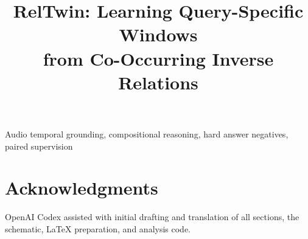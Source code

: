 \documentclass[10pt,letterpaper]{article}
\title{\fontsize{14}{16}\selectfont RelTwin: Learning Query-Specific Windows\\from Co-Occurring Inverse Relations}
\begin{document}
\maketitle

\begin{keywords}
Audio temporal grounding, compositional reasoning, hard answer negatives, paired supervision
\end{keywords}









\section{Acknowledgments}
OpenAI Codex assisted with initial drafting and translation of all sections, the schematic, LaTeX preparation, and analysis code.
\clearpage
\balance


\end{document}
